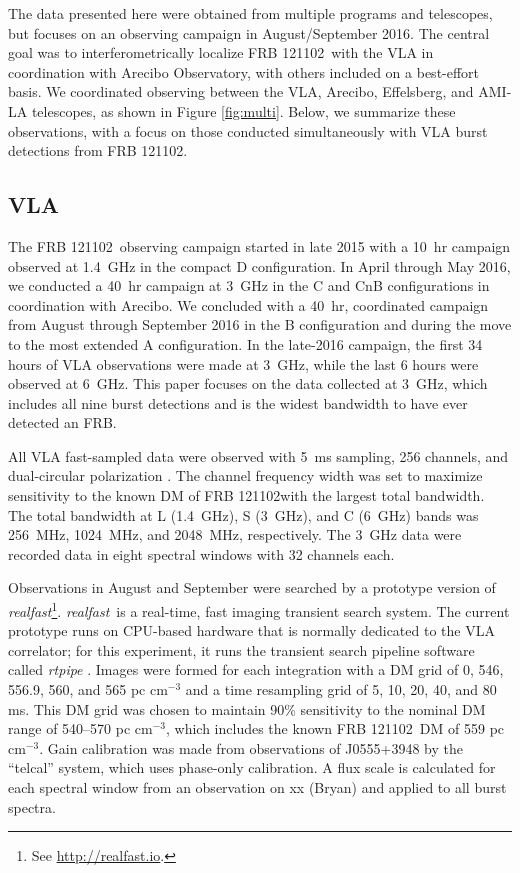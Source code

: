 \documentclass[twocolumn]{aastex61}
\newcommand{\rf}{\emph{realfast}}
\newcommand{\frb}{FRB 121102}
\begin{document}
The data presented here were obtained from multiple programs and telescopes, but focuses on an observing campaign in August/September 2016. The central goal was to interferometrically localize \frb\ with the VLA in coordination with Arecibo Observatory, with others included on a best-effort basis. We coordinated observing between the VLA, Arecibo, Effelsberg, and AMI-LA telescopes, as shown in Figure \ref{fig:multi}. Below, we summarize these observations, with a focus on those conducted simultaneously with VLA burst detections from \frb.

\subsection{VLA}
The \frb\ observing campaign started in late 2015 with a 10~hr campaign observed at 1.4~GHz in the compact D configuration. In April through May 2016, we conducted a 40~hr campaign at 3~GHz in the C and CnB configurations in coordination with Arecibo. We concluded with a 40~hr, coordinated campaign from August through September 2016 in the B configuration and during the move to the most extended A configuration. In the late-2016 campaign, the first 34 hours of VLA observations were made at 3~GHz, while the last 6 hours were observed at 6~GHz. This paper focuses on the data collected at 3~GHz, which includes all nine burst detections and is the widest bandwidth to have ever detected an FRB.

All VLA fast-sampled data were observed with 5~ms sampling, 256 channels, and dual-circular polarization \citep{2015ApJ...807...16L}. The channel frequency width was set to maximize sensitivity to the known DM of \frb with the largest total bandwidth. The total bandwidth at L (1.4~GHz), S (3~GHz), and C (6~GHz) bands was 256~MHz, 1024~MHz, and 2048~MHz, respectively. The 3~GHz data were recorded data in eight spectral windows with 32 channels each.

Observations in August and September were searched by a prototype version of \rf\footnote{See \url{http://realfast.io}.}. \rf\ is a real-time, fast imaging transient search system. The current prototype runs on CPU-based hardware that is normally dedicated to the VLA correlator; for this experiment, it runs the transient search pipeline software called \emph{rtpipe} \citep[\url{https://github.com/caseyjlaw/rtpipe};][]{2015ApJ...807...16L}. Images were formed for each integration with a DM grid of 0, 546, 556.9, 560, and 565 pc cm$^{-3}$ and a time resampling grid of 5, 10, 20, 40, and 80 ms. This DM grid was chosen to maintain 90\% sensitivity to the nominal DM range of 540--570 pc cm$^{-3}$, which includes the known \frb\ DM of 559 pc cm$^{-3}$. Gain calibration was made from observations of J0555+3948 by the ``telcal'' system, which uses phase-only calibration. A flux scale is calculated for each spectral window from an observation on {\color{red}xx (Bryan)} and applied to all burst spectra.
\end{document}
